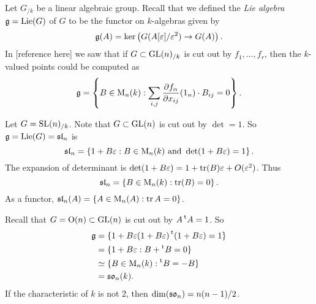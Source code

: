 Let $G_{/k}$ be a linear algebraic group. Recall that we defined the \emph{Lie 
algebra} $\mathfrak{g}=\operatorname{Lie}(G)$ of $G$ to be the functor on $k$-algebras given by 
\[
  \mathfrak{g}(A) = \ker\left(G(A[\varepsilon]/\varepsilon^2) \to G(A)\right) .
\]
In [reference here] we saw that if $G\subset \operatorname{GL}(n)_{/k}$ is cut out by 
$f_1,\dots,f_r$, then the $k$-valued points could be computed as 
\[
  \mathfrak{g} = \left\{B\in \operatorname{M}_n(k):\sum_{i,j} \frac{\partial f_\alpha}{\partial x_{i j}}(1_n)\cdot B_{i j}=0\right\} .
\]

\begin{example}
Let $G=\operatorname{SL}(n)_{/k}$. Note that $G\subset \operatorname{GL}(n)$ is cut out by $\det=1$. So 
$\mathfrak{g}=\operatorname{Lie}(G)=\mathfrak{sl}_n$ is 
\[
  \mathfrak{sl}_n = \left\{1+B\varepsilon:B\in \operatorname{M}_n(k)\text{ and }\det(1+B\varepsilon)=1\right\} .
\]
The expansion of determinant is 
$\det(1+B\varepsilon)=1+\operatorname{tr}(B)\varepsilon + O(\varepsilon^2)$. Thus 
\[
  \mathfrak{sl}_n = \left\{B\in \operatorname{M}_n(k):\operatorname{tr}(B)=0\right\} .
\]
As a functor, $\mathfrak{sl}_n(A)=\{A\in \operatorname{M}_n(A):\operatorname{tr} A=0\}$. 
\end{example}

\begin{example}[Orthogonal]
Recall that $G=\operatorname{O}(n)\subset \operatorname{GL}(n)$ is cut out by $A \prescript{\mathrm{t}}{}{A}=1$. So 
\begin{align*}
  \mathfrak{g}
    &= \{1+B\varepsilon  (1+B\varepsilon) \prescript{\mathrm{t}}{}{(1+B\varepsilon)}=1\} \\
    &= \{1+B\varepsilon:B+\prescript{\mathrm{t}}{}{B}=0\} \\
    &\simeq \{B\in \operatorname{M}_n(k):\prescript{\mathrm{t}}{}{B}=-B\} \\
    &= \mathfrak{so}_n(k) .
\end{align*}
If the characteristic of $k$ is not $2$, then $\dim(\mathfrak{so}_n)=n(n-1)/2$. 
\end{example}

